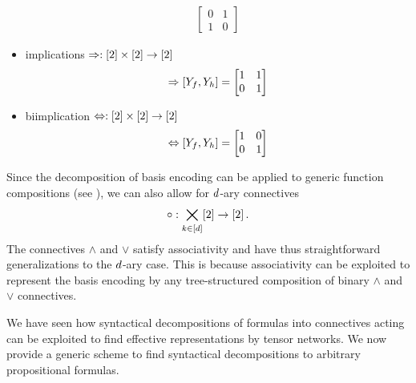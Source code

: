 \begin{example}
\begin{itemize}
\begin{align*}
\begin{bmatrix}
                  0 & 1 \\
                  1 & 0
            \end{bmatrix}
        \end{align*}
        \item implications $\Rightarrow:  [2]\times[2] \rightarrow[2]$
        \begin{align*}
            \Rightarrow[Y_{f},Y_{h}]
            = \begin{bmatrix}
                  1 & 1 \\
                  0 & 1
            \end{bmatrix}
        \end{align*}
        \item biimplication $\Leftrightarrow:  [2]\times[2] \rightarrow[2]$
        \begin{align*}
            \Leftrightarrow[Y_{f},Y_{h}]
            = \begin{bmatrix}
                  1 & 0 \\
                  0 & 1
            \end{bmatrix}
        \end{align*}
    \end{itemize}
\end{example}

\begin{remark}
    \label{rem:naryConnectives}
    Since the decomposition of basis encoding can be applied to generic function compositions (see ), we can also allow for $d$-ary connectives
    \begin{align*}
        \circ : \bigtimes_{k\in[d]} [2] \rightarrow [2] \, .
    \end{align*}
    The connectives $\land$ and $\lor$ satisfy associativity and have thus straightforward generalizations to the $d$-ary case.
    This is because associativity can be exploited to represent the basis encoding by any tree-structured composition of binary $\land$ and $\lor$ connectives.
\end{remark}



\label{sec:termClauseDecomposition}

We have seen how syntactical decompositions of formulas into connectives acting can be exploited to find effective representations by tensor networks.
We now provide a generic scheme to find syntactical decompositions to arbitrary propositional formulas.

